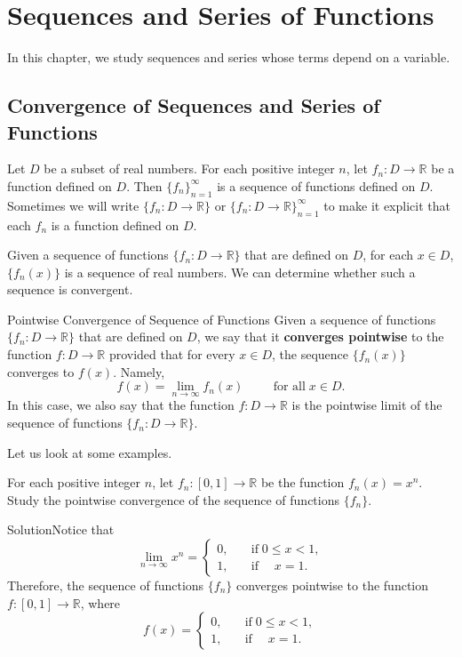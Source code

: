  
 
 

\chapter{Sequences and Series of Functions}\label{ch6}

 In this chapter, we   study sequences and series whose terms depend on a variable. 
 
\section{Convergence of Sequences and Series of Functions}\label{sec6.1}
Let $D$ be a subset of real numbers. For each positive integer $n$, let $f_n:D\to\mathbb{R}$ be a function defined on $D$. Then $\{f_n\}_{n=1}^{\infty}$ is a sequence of functions defined on $D$. Sometimes we will write $\{f_n:D\to\mathbb{R}\}$ or  $\{f_n:D\to\mathbb{R}\}_{n=1}^{\infty}$ to make it explicit that each $f_n$ is a function defined on $D$. 

Given a sequence of functions $\{f_n:D\to\mathbb{R}\}$ that are defined on $D$, for each $x\in D$, $\{f_n(x)\}$ is a sequence of real numbers. We can determine whether such a sequence is convergent.

\begin{definition}{Pointwise Convergence of Sequence of Functions}
Given a sequence of functions $\{f_n:D\to\mathbb{R}\}$ that are defined on $D$, we say that it {\bf converges pointwise} to the function $f:D\to\mathbb{R}$ provided that  for every $x\in D$, the sequence $\{f_n(x)\}$ converges to $f(x)$. Namely,
\[f(x)=\lim_{n\to\infty}f_n(x)\hspace{1cm}\text{for all}\;x\in D.\]In this case, we also say that the function $f:D\to\mathbb{R}$ is the pointwise limit of the sequence of functions $\{f_n:D\to\mathbb{R}\}$.
\end{definition}
 
 Let us look at some examples.
\begin{example}[label=230303_1]{}
 For each positive integer $n$, let $f_n:[0,1]\to\mathbb{R}$ be the function $f_n(x)=x^n$. Study the pointwise convergence of the sequence of functions $\{f_n\}$.
\end{example}
\begin{solution}{Solution}Notice that
 \[\lim_{n\to\infty}x^n=\begin{cases}0,\quad &\text{if}\;0\leq x<1,\\1,\quad &\text{if}\;\quad x=1.\end{cases}\] 
Therefore, the sequence of functions $\{f_n\}$ converges pointwise to the function $f:[0,1]\to\mathbb{R}$, where
 \[f(x)=\begin{cases}0,\quad &\text{if}\;0\leq x<1,\\1,\quad &\text{if}\;\quad x=1.\end{cases}\]
\end{solution}

